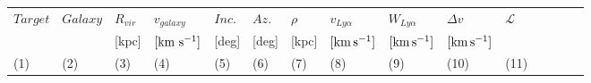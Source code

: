 \documentclass[twocolumn,tighten]{aastex6}
\begin{document}
\begin{table}[ht]\footnotesize
\begin{center}
\begin{tabular}{l l l l l l l l l l l l l l l}
 \hline \hline
  $Target$	&  $Galaxy$  & $R_{vir}$        & $v_{galaxy}$ 	   	  &  $Inc.$               &  $Az.$ 	       & $\rho$		   & $v_{Ly\alpha}$	 	  	& $W_{Ly\alpha}$  & $\Delta v$  			 & $\mathcal{L}$ \\ 
  	  &       & \scriptsize [kpc] & \scriptsize  $\rm [km ~s^{-1}]$ & \scriptsize [deg] & \scriptsize [deg] & \scriptsize [kpc] & \scriptsize  $\rm [km\, s^{-1}]$ & \scriptsize $\rm [km\, s^{-1}]$ & \scriptsize  $\rm [km\, s^{-1}]$ &  \\
 \scriptsize (1) & \scriptsize (2) & \scriptsize (3)    & \scriptsize (4)     & \scriptsize (5)    & \scriptsize (6)   & \scriptsize  (7)   & \scriptsize (8) & \scriptsize (9) & \scriptsize (10) & \scriptsize (11) \\ \hline \hline


\end{tabular}
\end{center}
\end{table}
\end{document}
